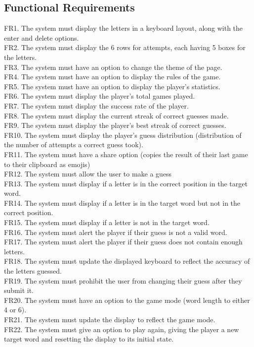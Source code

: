 \documentclass[12pt, titlepage]{article}
\begin{document}
	\subsection{Functional Requirements} FR1. The system must display the 
	letters
	in a keyboard layout, along with the enter and delete options. \\ FR2. The
	system must display the 6 rows for attempts, each having 5 boxes for the
	letters. \\ FR3. The system must have an option to change the theme of the
	page. \\ FR4. The system must have an option to display the rules of the 
	game. \\
	FR5. The system must have an option to display the player’s statistics. \\ 
	FR6.
	The system must display the player’s total games played. \\ FR7. The system
	must display the success rate of the player. \\ FR8. The system must display
	the current streak of correct guesses made. \\ FR9. The system must display 
	the
	player’s best streak of correct guesses. \\ FR10. The system must display 
	the
	player’s guess distribution (distribution of the number of attempts a
	correct guess took). \\ FR11. The system must have a share option (copies 
	the
	result of their last game to their clipboard as emojis) \\ FR12. The system
	must allow the user to make a guess \\ FR13. The system must display if a
	letter is in the correct position in the target word. \\ FR14. The system 
	must
	display if a letter is in the target word but not in the correct position.
	\\ FR15. The system must display if a letter is not in the target word. \\ 
	FR16.
	The system must alert the player if their guess is not a valid word. \\ 
	FR17.
	The system must alert the player if their guess does not contain enough
	letters. \\ FR18. The system must update the displayed keyboard to reflect 
	the
	accuracy of the letters guessed. \\ FR19. The system must prohibit the user 
	from
	changing their guess after they submit it. \\ FR20. The system must have an
	option to the game mode (word length to either 4 or 6). \\ FR21. The system
	must update the display to reflect the game mode. \\ FR22. The system must 
	give an
	option to play again, giving the player a new target word and resetting the
	display to its initial state. 
	\newpage
\end{document}
